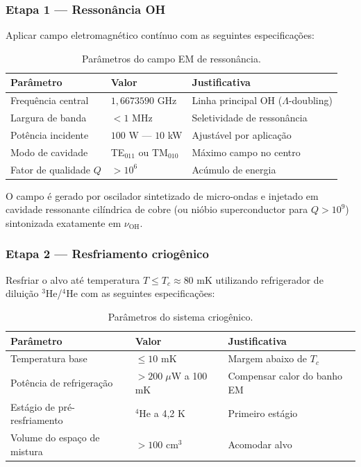\documentclass[12pt,a4paper]{article}
\newcommand{\nuOH}{\nu_{\text{OH}}}
\newcommand{\Tcrit}{T_c}
\begin{document}
\subsubsection{Etapa 1 --- Ressonância OH}

Aplicar campo eletromagnético contínuo com as seguintes
especificações:

\begin{table}[H]
\centering
\caption{Parâmetros do campo EM de ressonância.}
\label{tab:em}
\begin{tabular}{lll}
\toprule
\textbf{Parâmetro} & \textbf{Valor} & \textbf{Justificativa} \\
\midrule
Frequência central & $1{,}6673590$ GHz
  & Linha principal OH ($\Lambda$-doubling) \\
Largura de banda & $< 1$ MHz & Seletividade de ressonância \\
Potência incidente & $100$ W --- $10$ kW
  & Ajustável por aplicação \\
Modo de cavidade & TE$_{011}$ ou TM$_{010}$
  & Máximo campo no centro \\
Fator de qualidade $Q$ & $> 10^6$ & Acúmulo de energia \\
\bottomrule
\end{tabular}
\end{table}

O campo é gerado por oscilador sintetizado de micro-ondas
e injetado em cavidade ressonante cilíndrica de cobre
(ou nióbio superconductor para $Q > 10^9$) sintonizada
exatamente em $\nuOH$.

\subsubsection{Etapa 2 --- Resfriamento criogênico}

Resfriar o alvo até temperatura $T \leq \Tcrit \approx 80$ mK
utilizando refrigerador de diluição $^3$He/$^4$He com as
seguintes especificações:

\begin{table}[H]
\centering
\caption{Parâmetros do sistema criogênico.}
\label{tab:crio}
\begin{tabular}{lll}
\toprule
\textbf{Parâmetro} & \textbf{Valor} & \textbf{Justificativa} \\
\midrule
Temperatura base & $\leq 10$ mK & Margem abaixo de $\Tcrit$ \\
Potência de refrigeração & $> 200\;\mu$W a 100 mK
  & Compensar calor do banho EM \\
Estágio de pré-resfriamento & $^4$He a 4,2 K
  & Primeiro estágio \\
Volume do espaço de mistura & $> 100$ cm$^3$
  & Acomodar alvo \\
\bottomrule
\end{tabular}
\end{table}
\end{document}
